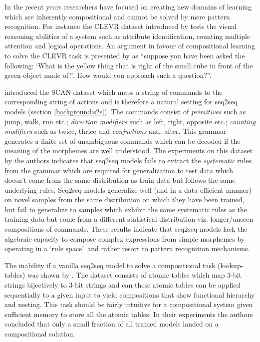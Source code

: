 In the recent years researchers have focused on creating new domains of learning which are inherently compositional and cannot be solved by mere pattern recognition. For instance the CLEVR dataset introduced by \cite{Johnson2017} tests the visual reasoning abilities of a system such as attribute identification, counting multiple attention and logical operations. An argument in favour of compositional learning to solve the CLEVR task is presented by \cite{Hudson2018} as ``suppose you have been asked the following: `What is the yellow thing that is right of the small cube in front of the green object made of?'. How would you approach such a question?''. 

\cite{Lake2017} introduced the SCAN dataset which maps a string of commands to the corresponding string of actions and is therefore a natural setting for seq2seq models (section \ref{background:s2s}). The commands consist of \textit{primitives} such as jump, walk, run etc.; \textit{direction modifiers} such as left, right, opposite etc.; \textit{counting modifiers} such as twice, thrice and \textit{conjuctions} and, after. This grammar generates a finite set of unambiguous commands which can be decoded if the meaning of the morphemes are well understood. The experiments on this dataset by the authors indicates that seq2seq models fails to extract the \textit{systematic} rules from the grammar which are required for generalization to test data which doesn't come from the same distribution as train data but follows the same underlying rules. Seq2seq models generalize well (and in a data efficient manner) on novel samples from the same distribution on which they have been trained, but fail to generalize to samples which exhibit the same systematic rules as the training data but come from a different statistical distribution viz. longer/unseen compositions of commands. These results indicate that seq2seq models lack the algebraic capacity to compose complex expressions from simple morphemes by operating in a \lq rule space{}\rq\ and rather resort to pattern recognition mechanisms.

The inability if a vanilla seq2seq model to solve a compositional task (lookup-tables) was shown by \cite{Liska2018}. The dataset consists of atomic tables which map 3-bit strings bijectively to 3-bit strings and can these atomic tables can be applied sequentially to a given input to yield compositions that show functional hierarchy and nesting. This task should be fairly intuitive for a compositional system given sufficient memory to store all the atomic tables. In their experiments the authors concluded that only a small fraction of all trained models landed on a compositional solution.

